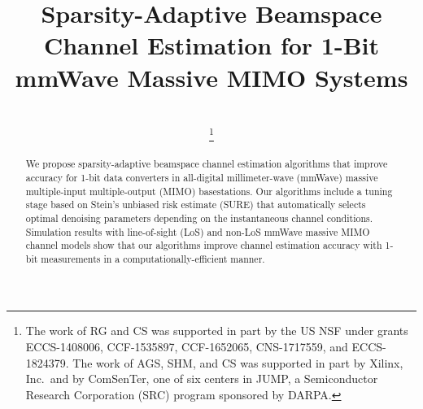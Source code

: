 \documentclass[conference,10pt,twocolumn,letter]{IEEEtran}
\begin{document}
\title{Sparsity-Adaptive Beamspace Channel Estimation for 1-Bit mmWave Massive MIMO Systems}



\author{ \\[-0.1cm]
%
\thanks{The work of RG and CS was supported in part by the US NSF under grants ECCS-1408006, CCF-1535897,  CCF-1652065, CNS-1717559, and ECCS-1824379. The work of AGS, SHM, and CS was supported in part by Xilinx, Inc.\ and by ComSenTer, one of six centers in JUMP, a Semiconductor Research Corporation (SRC) program sponsored by DARPA.  
%
}\\[-0.2cm]
}

\maketitle
\begin{abstract}
We propose sparsity-adaptive beamspace channel estimation algorithms that improve accuracy for 1-bit data converters in all-digital millimeter-wave (mmWave) massive multiple-input multiple-output (MIMO)  basestations. Our algorithms include a tuning stage based on Stein's unbiased risk estimate (SURE) that automatically selects optimal denoising parameters depending on the instantaneous channel conditions. Simulation results with line-of-sight (LoS) and non-LoS mmWave massive MIMO channel models show that our algorithms improve channel estimation accuracy with 1-bit measurements in a computationally-efficient manner.
\end{abstract}








\appendices 



\balance


\balance
\end{document}
